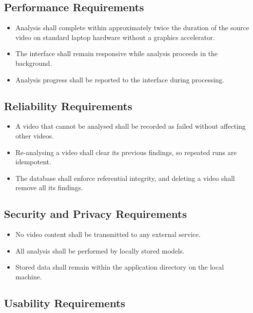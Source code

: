 \documentclass[12pt,a4paper,twoside]{report}
\begin{document}
\subsection{Performance Requirements}

\begin{itemize}
\item Analysis shall complete within approximately twice the duration of the source video on standard laptop hardware without a graphics accelerator.
\item The interface shall remain responsive while analysis proceeds in the background.
\item Analysis progress shall be reported to the interface during processing.
\end{itemize}

\subsection{Reliability Requirements}

\begin{itemize}
\item A video that cannot be analysed shall be recorded as failed without affecting other videos.
\item Re-analysing a video shall clear its previous findings, so repeated runs are idempotent.
\item The database shall enforce referential integrity, and deleting a video shall remove all its findings.
\end{itemize}

\subsection{Security and Privacy Requirements}

\begin{itemize}
\item No video content shall be transmitted to any external service.
\item All analysis shall be performed by locally stored models.
\item Stored data shall remain within the application directory on the local machine.
\end{itemize}

\subsection{Usability Requirements}
\end{document}
